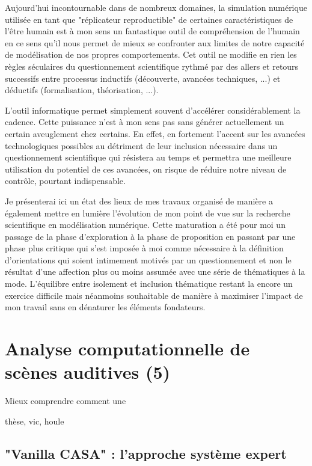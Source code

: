Aujourd'hui incontournable dans de nombreux domaines, la simulation numérique utilisée en tant que "réplicateur reproductible" de certaines caractéristiques de l'être humain est à mon sens un fantastique outil de compréhension de l'humain en ce sens qu'il nous permet de mieux se confronter aux limites de notre capacité de modélisation de nos propres comportements. Cet outil ne modifie en rien les règles séculaires du questionnement scientifique rythmé par des allers et retours successifs entre processus inductifs (découverte, avancées techniques, ...) et déductifs (formalisation, théorisation, ...).

L'outil informatique permet simplement souvent d'accélérer considérablement la cadence. Cette puissance n'est à mon sens pas sans générer actuellement un certain aveuglement chez certains. En effet, en fortement l'accent sur les avancées technologiques possibles au détriment de leur inclusion nécessaire dans un questionnement scientifique qui résistera au temps et permettra une meilleure utilisation du potentiel de ces avancées, on risque de réduire notre niveau de contrôle, pourtant indispensable.

Je présenterai ici un état des lieux de mes travaux organisé de manière a également mettre en lumière l'évolution de mon point de vue sur la recherche scientifique en modélisation numérique. Cette maturation a été pour moi un passage de la phase d'exploration à la phase de proposition en passant par une phase plus critique qui s'est imposée à moi comme nécessaire à la définition d'orientations qui soient intimement motivés par un questionnement et non le résultat d'une affection plus ou moins assumée avec une série de thématiques à la mode. L'équilibre entre isolement et inclusion thématique restant la encore un exercice difficile mais néanmoins souhaitable de manière à maximiser l'impact de mon travail sans en dénaturer les éléments fondateurs.

\section{Analyse computationnelle de scènes auditives (5)}

Mieux comprendre comment une

thèse, vic, houle

\subsection{"Vanilla CASA" : l'approche système expert}

